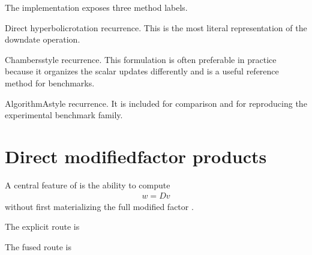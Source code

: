 \documentclass[a4paper,11pt,english]{sphinxmanual}
\begin{document}
\sphinxAtStartPar
The implementation exposes three method labels.
\begin{description}
\sphinxAtStartPar
Direct hyperbolic\sphinxhyphen{}rotation recurrence.  This is the most literal
representation of the downdate operation.

\sphinxAtStartPar
Chambers\sphinxhyphen{}style recurrence.  This formulation is often preferable in
practice because it organizes the scalar updates differently and is a useful
reference method for benchmarks.

\sphinxAtStartPar
Algorithm\sphinxhyphen{}A\sphinxhyphen{}style recurrence.  It is included for comparison and for
reproducing the experimental benchmark family.

\end{description}


\section{Direct modified\sphinxhyphen{}factor products}
\label{\detokenize{manual:direct-modified-factor-products}}
\sphinxAtStartPar
A central feature of  is the ability to compute
\begin{equation*}
\begin{split}w = D v\end{split}
\end{equation*}
\sphinxAtStartPar
without first materializing the full modified factor .

\sphinxAtStartPar
The explicit route is

\begin{sphinxVerbatim}[commandchars=\\\{\}]
   
    
\end{sphinxVerbatim}

\sphinxAtStartPar
The fused route is

\begin{sphinxVerbatim}[commandchars=\\\{\}]
     
\end{sphinxVerbatim}
\end{document}
